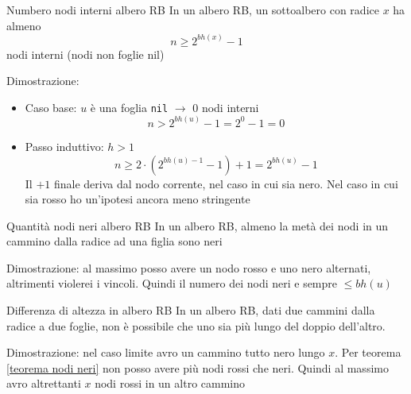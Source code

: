 \begin{teorema}{Numbero nodi interni albero RB}\label{number of nodes of rbt}
	In un albero RB, un sottoalbero con radice $ x $ ha almeno
	\[
		n \ge 2^{bh\left(x\right)} - 1
	\]
	nodi interni (nodi non foglie {\ttfamily nil})
\end{teorema}
Dimostrazione:
\begin{itemize}
	\item Caso base: $ u $ è una foglia \verb|nil| $ \rightarrow  $ 0 nodi interni
	      \[
		      n>2^{bh\left(u\right)} - 1 = 2^{0} - 1  = 0
	      \]
	\item Passo induttivo: $ h>1 $
	      \[
		      n \ge 2 \cdot \left(2^{bh\left(u\right)-1}-1\right)+1 = 2^{bh\left(u\right)}-1
	      \]
	      Il $ +1 $ finale deriva dal nodo corrente, nel caso in cui sia nero. Nel caso in cui sia rosso ho un'ipotesi ancora meno stringente
\end{itemize}
\vskip6mm
\begin{teorema}{Quantità nodi neri albero RB}\label{number of black nodes of rbt}
	In un albero RB, almeno la metà dei nodi in un cammino dalla radice ad una figlia sono neri
\end{teorema}\label{teorema nodi neri}
Dimostrazione: al massimo posso avere un nodo rosso e uno nero alternati, altrimenti violerei i vincoli. Quindi il numero dei nodi neri e sempre $ \le bh\left(u\right) $

\vskip6mm
\begin{teorema}{Differenza di altezza in albero RB}
	In un albero RB, dati due cammini dalla radice a due foglie, non è possibile che uno sia più lungo del doppio dell'altro.
\end{teorema}
Dimostrazione: nel caso limite avro un cammino tutto nero lungo $ x $. Per teorema \ref{teorema nodi neri} non posso avere più nodi rossi che neri. Quindi al massimo avro altrettanti $ x $ nodi rossi in un altro cammino

